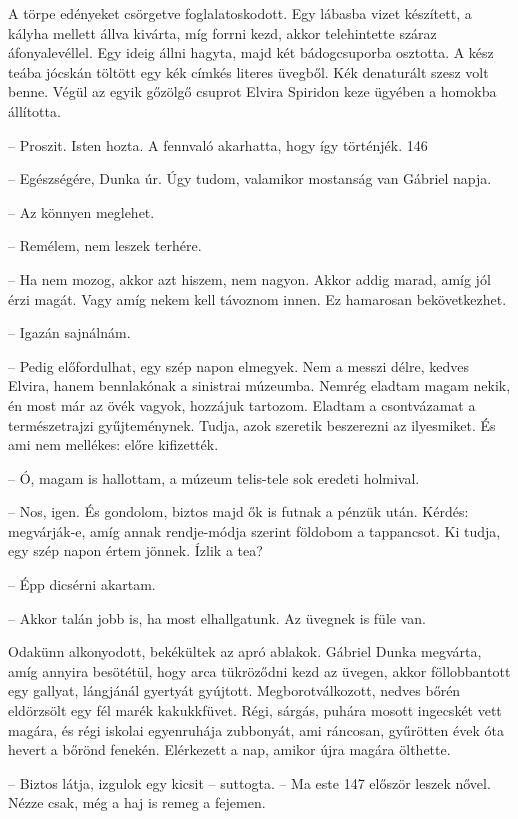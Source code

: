 \documentclass{IEEEtran}
\begin{document}
A törpe edényeket csörgetve foglalatoskodott. Egy lábasba vizet készített, a
kályha mellett állva kivárta, míg forrni kezd, akkor telehintette száraz
áfonyalevéllel. Egy ideig állni hagyta, majd két bádogcsuporba osztotta. A
kész teába jócskán töltött egy kék címkés literes üvegből. Kék denaturált
szesz volt benne. Végül az egyik gőzölgő csuprot Elvira Spiridon keze ügyében
a homokba állította.

– Proszit. Isten hozta. A fennvaló akarhatta, hogy így történjék.
146

– Egészségére, Dunka úr. Úgy tudom, valamikor mostanság van Gábriel napja.

– Az könnyen meglehet.

– Remélem, nem leszek terhére.

– Ha nem mozog, akkor azt hiszem, nem nagyon. Akkor addig marad, amíg jól érzi
magát. Vagy amíg nekem kell távoznom innen. Ez hamarosan bekövetkezhet.

– Igazán sajnálnám.

– Pedig előfordulhat, egy szép napon elmegyek. Nem a messzi délre, kedves
Elvira, hanem bennlakónak a sinistrai múzeumba. Nemrég eladtam magam nekik, én
most már az övék vagyok, hozzájuk tartozom. Eladtam a csontvázamat a
természetrajzi gyűjteménynek. Tudja, azok szeretik beszerezni az ilyesmiket.
És ami nem mellékes: előre kifizették.

– Ó, magam is hallottam, a múzeum telis-tele sok eredeti holmival.

– Nos, igen. És gondolom, biztos majd ők is futnak a pénzük után. Kérdés:
megvárják-e, amíg annak rendje-módja szerint földobom a tappancsot. Ki tudja,
egy szép napon értem jönnek. Ízlik a tea?

– Épp dicsérni akartam.

– Akkor talán jobb is, ha most elhallgatunk. Az üvegnek is füle van.

Odakünn alkonyodott, bekékültek az apró ablakok. Gábriel Dunka megvárta, amíg
annyira besötétül, hogy arca tükröződni kezd az üvegen, akkor föllobbantott
egy gallyat, lángjánál gyertyát gyújtott. Megborotválkozott, nedves bőrén
eldörzsölt egy fél marék kakukkfüvet. Régi, sárgás, puhára mosott ingecskét
vett magára, és régi iskolai egyenruhája zubbonyát, ami ráncosan, gyűrötten
évek óta hevert a bőrönd fenekén. Elérkezett a nap, amikor újra magára
ölthette.

– Biztos látja, izgulok egy kicsit – suttogta. – Ma este 147 először leszek
nővel. Nézze csak, még a haj is remeg a fejemen.
\end{document}
